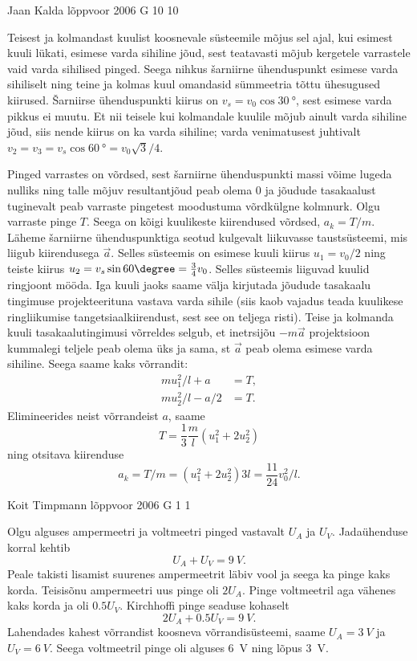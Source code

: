 \documentclass[11pt]{article}
\begin{document}
{%
{Jaan Kalda} %
{lõppvoor} %
{2006} %
{G 10} %
{10} %
{

\ifSolution
Teisest ja kolmandast kuulist koosnevale süsteemile mõjus sel ajal, kui esimest kuuli lükati, esimese varda sihiline jõud, sest teatavasti mõjub kergetele varrastele vaid varda sihilised pinged. Seega nihkus šarniirne ühenduspunkt esimese varda sihiliselt ning teine ja kolmas kuul omandasid sümmeetria tõttu ühesugused kiirused. Šarniirse ühenduspunkti kiirus on $v_s = v_0 \cos \SI{30}{\degree}$, sest esimese varda pikkus ei muutu. Et nii teisele kui kolmandale kuulile mõjub ainult varda sihiline jõud, siis nende kiirus on ka varda sihiline; varda venimatusest juhtivalt $v_2 = v_3 = v_s \cos \SI{60}{\degree} = v_0 \sqrt 3/4$.

Pinged varrastes on võrdsed, sest šarniirne ühenduspunkti massi võime lugeda nulliks ning talle mõjuv resultantjõud peab olema 0 ja jõudude tasakaalust tuginevalt peab varraste pingetest moodustuma võrdkülgne kolmnurk. Olgu varraste pinge $T$. Seega on kõigi kuulikeste kiirendused võrdsed, $a_k = T /m$. Läheme šarniirne ühenduspunktiga seotud kulgevalt liikuvasse taustsüsteemi, mis liigub kiirendusega $\vec a$. Selles süsteemis on esimese kuuli kiirus $u_1 = v_0/2$ ning teiste kiirus $u_2 = v_s \sin 60\degree = \frac{3}{4} v_0$. Selles süsteemis liiguvad kuulid ringjoont mööda. Iga kuuli jaoks saame välja kirjutada jõudude tasakaalu tingimuse projekteerituna vastava varda sihile (siis kaob vajadus teada kuulikese ringliikumise tangetsiaalkiirendust, sest see on teljega risti). Teise ja kolmanda kuuli tasakaalutingimusi võrreldes selgub, et inetrsijõu $-m\vec a$ projektsioon kummalegi teljele peab olema üks ja sama, st $\vec a$ peab olema esimese varda sihiline. Seega saame kaks võrrandit:
\[
\begin{aligned}
mu_1^2/l + a &= T,\\
mu_2^2/l - a/2 &= T.
\end{aligned}
\]
Elimineerides neist võrrandeist $a$, saame
\[
T=\frac{1}{3} \frac{m}{l}\left(u_{1}^{2}+2 u_2^{2}\right)
\]
ning otsitava kiirenduse
\[
a_{k}=T / m=\left(u_{1}^{2}+2 u_2^{2}\right) 3 l=\frac{11}{24} v_{0}^{2} / l.
\]
\fi
}

{Koit Timpmann} %
{lõppvoor} %
{2006} %
{G 1} %
{1} %
{

\ifSolution
Olgu alguses ampermeetri ja voltmeetri pinged vastavalt $U_A$ ja $U_V$. Jadaühenduse korral kehtib
\[
U_A + U_V = \SI{9}{V}.
\]
Peale takisti lisamist suurenes ampermeetrit läbiv vool ja seega ka pinge kaks korda. Teisisõnu ampermeetri uus pinge oli $2U_A$. Pinge voltmeetril aga vähenes kaks korda ja oli $\num{0,5}U_V$. Kirchhoffi pinge seaduse kohaselt
\[
2U_A + \num{0,5}U_V = \SI{9}{V}.
\]
Lahendades kahest võrrandist koosneva võrrandisüsteemi, saame $U_A = \SI{3}{V}$ ja $U_V = \SI{6}{V}$. Seega voltmeetril pinge oli alguses \SI{6}{V} ning lõpus \SI{3}{V}.
\fi
}

}
\end{document}
